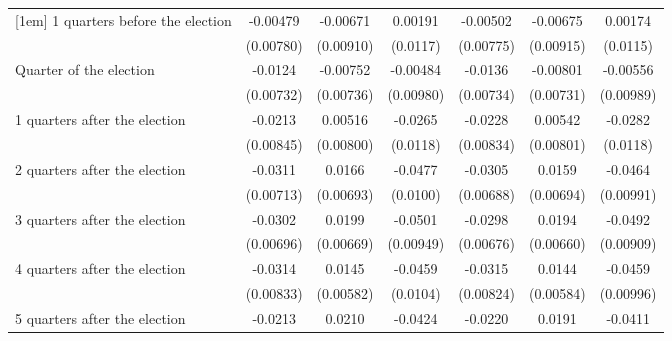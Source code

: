 \begin{table}[htbp]
\begin{tabular}{l*{6}{c}}
[1em]
 1 quarters before the election&    -0.00479         &    -0.00671         &     0.00191         &    -0.00502         &    -0.00675         &     0.00174         \\
                    &   (0.00780)         &   (0.00910)         &    (0.0117)         &   (0.00775)         &   (0.00915)         &    (0.0115)         \\
[1em]
Quarter of the election&     -0.0124         &    -0.00752         &    -0.00484         &     -0.0136         &    -0.00801         &    -0.00556         \\
                    &   (0.00732)         &   (0.00736)         &   (0.00980)         &   (0.00734)         &   (0.00731)         &   (0.00989)         \\
[1em]
 1 quarters after the election&     -0.0213\sym{*}  &     0.00516         &     -0.0265\sym{*}  &     -0.0228\sym{**} &     0.00542         &     -0.0282\sym{*}  \\
                    &   (0.00845)         &   (0.00800)         &    (0.0118)         &   (0.00834)         &   (0.00801)         &    (0.0118)         \\
[1em]
 2 quarters after the election&     -0.0311\sym{***}&      0.0166\sym{*}  &     -0.0477\sym{***}&     -0.0305\sym{***}&      0.0159\sym{*}  &     -0.0464\sym{***}\\
                    &   (0.00713)         &   (0.00693)         &    (0.0100)         &   (0.00688)         &   (0.00694)         &   (0.00991)         \\
[1em]
 3 quarters after the election&     -0.0302\sym{***}&      0.0199\sym{**} &     -0.0501\sym{***}&     -0.0298\sym{***}&      0.0194\sym{**} &     -0.0492\sym{***}\\
                    &   (0.00696)         &   (0.00669)         &   (0.00949)         &   (0.00676)         &   (0.00660)         &   (0.00909)         \\
[1em]
 4 quarters after the election&     -0.0314\sym{***}&      0.0145\sym{*}  &     -0.0459\sym{***}&     -0.0315\sym{***}&      0.0144\sym{*}  &     -0.0459\sym{***}\\
                    &   (0.00833)         &   (0.00582)         &    (0.0104)         &   (0.00824)         &   (0.00584)         &   (0.00996)         \\
[1em]
 5 quarters after the election&     -0.0213\sym{**} &      0.0210\sym{*}  &     -0.0424\sym{**} &     -0.0220\sym{**} &      0.0191\sym{*}  &     -0.0411\sym{**} \\

\end{tabular}
\end{table}
